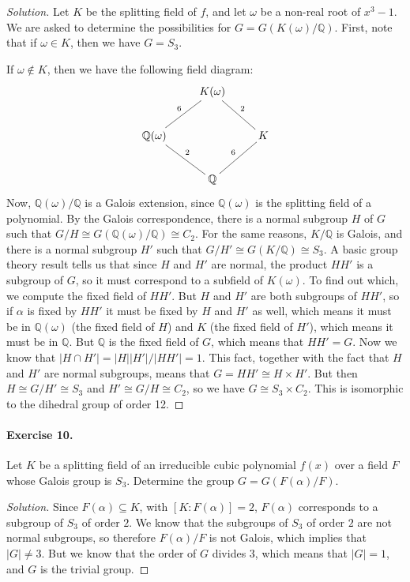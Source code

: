 \documentclass{article}
\newcommand{\Q}{\mathbb Q}
\begin{document}
\begin{proof}[Solution]
Let $K$ be the splitting field of $f$, and let $\omega$ be a non-real
root of $x^3-1$. We are asked to determine the possibilities for
$G=G(K(\omega)/\Q)$. First, note that if $\omega\in K$, then
we have  $G=S_3$. 

If $\omega \not\in K$, then we have the following field diagram:
\begin{equation*}
\xymatrix{
&K(\omega)\ar@{-}[dl]_{6} \ar@{-}[dr]^{2}& \\
\Q(\omega) && K \\
&\Q\ar@{-}[ul]_2 \ar@{-}[ur]^{6}
}
\end{equation*}
Now, $\Q(\omega)/\Q$ is a Galois extension, 
since $\Q(\omega)$ is the splitting field of a polynomial.
By the Galois correspondence, there is a normal subgroup $H$ of $G$
such that $G/H\cong G(\Q(\omega)/\Q)\cong C_2$.
For the same reasons, $K/\Q$ is Galois, and there is a normal subgroup
$H'$ such that $G/H'\cong G(K/\Q)\cong S_3$. A basic group theory
result tells us that since $H$ and $H'$ are normal, the product $HH'$
is a subgroup of $G$, so it must correspond to a subfield of
$K(\omega)$. To find out which, we compute the fixed field of
$HH'$. But $H$ and $H'$ are both subgroups of $HH'$, so if $\alpha$ is
fixed by $HH'$ it must be fixed by $H$ and $H'$ as well, which means
it must be in $\Q(\omega)$ (the fixed field of $H$) and $K$ (the fixed
field of $H'$), which means it must be in $\Q$. But $\Q$ is the fixed
field of $G$, which means that $HH'=G$. Now we know that $|H\cap H'|
= |H||H'|/|HH'| = 1$. This fact, together with the fact that $H$ and
$H'$ are normal subgroups, means that $G=HH'\cong H\times H'$.
But then $H\cong G/H'\cong S_3$ and $H'\cong G/H\cong C_2$, so we have
$G\cong S_3\times C_2$. This is isomorphic to the dihedral group of
order 12.
\end{proof}

\paragraph{Exercise 10.} Let $K$ be a splitting field of an
irreducible cubic polynomial $f(x)$ over a field $F$ whose Galois
group is $S_3$. Determine the group $G=G(F(\alpha)/F)$. 

\begin{proof}[Solution]
Since $F(\alpha)\subseteq K$, with $[K:F(\alpha)]=2$, 
$F(\alpha)$ corresponds to a subgroup of $S_3$ of order $2$. We know
that the subgroups of $S_3$ of order $2$ are not normal subgroups, so
therefore $F(\alpha)/F$ is not Galois, which implies that
$|G|\neq 3$. But we know that the order of $G$ divides $3$, which
means that $|G|=1$, and $G$ is the trivial group.
\end{proof}
\end{document}
